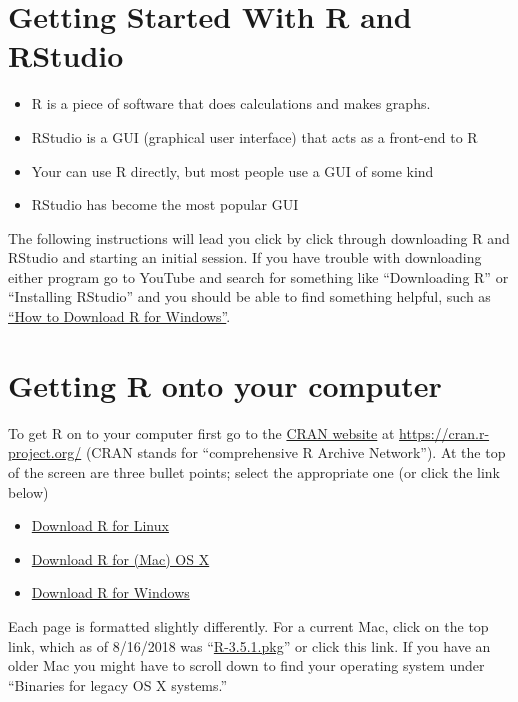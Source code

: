 \documentclass[]{book}
\providecommand{\tightlist}{%
  \setlength{\itemsep}{0pt}\setlength{\parskip}{0pt}}
\theoremstyle{definition}
\theoremstyle{definition}
\theoremstyle{definition}
\theoremstyle{remark}
\begin{document}
\section{Getting Started With R and
RStudio}\label{getting-started-with-r-and-rstudio}

\begin{itemize}
\tightlist
\item
  R is a piece of software that does calculations and makes graphs.
\item
  RStudio is a GUI (graphical user interface) that acts as a front-end
  to R
\item
  Your can use R directly, but most people use a GUI of some kind
\item
  RStudio has become the most popular GUI
\end{itemize}

The following instructions will lead you click by click through
downloading R and RStudio and starting an initial session. If you have
trouble with downloading either program go to YouTube and search for
something like ``Downloading R'' or ``Installing RStudio'' and you
should be able to find something helpful, such as
\href{https://www.youtube.com/watch?v=GYdmkLgV9n8}{``How to Download R
for Windows''}.

\section{Getting R onto your
computer}\label{getting-r-onto-your-computer}

To get R on to your computer first go to the
\href{https://cran.r-project.org/}{CRAN website} at
\url{https://cran.r-project.org/} (CRAN stands for ``comprehensive R
Archive Network''). At the top of the screen are three bullet points;
select the appropriate one (or click the link below)

\begin{itemize}
\tightlist
\item
  \href{https://cran.r-project.org/bin/linux/}{Download R for Linux}
\item
  \href{https://cran.r-project.org/bin/macosx/}{Download R for (Mac) OS
  X}
\item
  \href{https://cran.r-project.org/bin/windows/}{Download R for Windows}
\end{itemize}

Each page is formatted slightly differently. For a current Mac, click on
the top link, which as of 8/16/2018 was
``\href{https://cran.r-project.org/bin/macosx/R-3.5.1.pkg}{R-3.5.1.pkg}''
or click this link. If you have an older Mac you might have to scroll
down to find your operating system under ``Binaries for legacy OS X
systems.''
\end{document}
